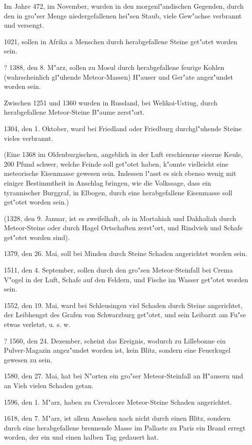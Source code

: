 \documentclass[a4paper, 11pt, oneside, polutonikogreek, german]{article}
\begin{document}
Im Jahre 472, im November, wurden in den morgenl"andischen Gegenden, durch den in gro"ser Menge niedergefallenen hei"sen Staub, viele Gew"achse verbrannt und versengt.

1021, sollen in Afrika a Menschen durch herabgefallene Steine get"otet worden sein.

? 1388, den 8. M"arz, sollen zu Mosul durch herabgefallene feurige Kohlen (wahrscheinlich gl"uhende Meteor-Massen) H"auser und Ger"ate angez"undet worden sein.

Zwischen 1251 und 1360 wurden in Russland, bei Welikoi-Ustiug, durch herabgefallene Meteor-Steine B"aume zerst"ort.

1304, den 1. Oktober, ward bei Friedland oder Friedburg durchgl"uhende Steine vieles verbrannt.

(Eine 1368 im Oldenburgischen, angeblich in der Luft erschienene eiserne Keule, 200 Pfund schwer, welche Feinde soll get"otet haben, k"onnte vielleicht eine meteorische Eisenmasse gewesen sein. Indessen l"asst es sich ebenso wenig mit einiger Bestimmtheit in Anschlag bringen, wie die Volkssage, dass ein tyrannischer Burggraf, in Elbogen, durch eine herabgefallene Eisenmasse soll get"otet worden sein.)

(1328, den 9. Januar, ist es zweifelhaft, ob in Mortahiah und Dakhaliah durch Meteor-Steine oder durch Hagel Ortschaften zerst"ort, und Rindvieh und Schafe get"otet worden sind).

1379, den 26. Mai, soll bei Minden durch Steine Schaden angerichtet worden sein.

1511, den 4. September, sollen durch den gro"sen Meteor-Steinfall bei Crema V"ogel in der Luft, Schafe auf den Feldern, und Fische im Wasser get"otet worden sein.

1552, den 19. Mai, ward bei Schleusingen viel Schaden durch Steine angerichtet, der Leibhengst des Grafen von Schwarzburg get"otet, und sein Leibarzt am Fu"se etwas verletzt, u. s. w.

? 1560, den 24. Dezember, scheint das Ereignis, wodurch zu Lillebonne ein Pulver-Magazin angez"undet worden ist, kein Blitz, sondern eine Feuerkugel gewesen zu sein.

1580, den 27. Mai, hat bei N"orten ein gro"ser Meteor-Steinfall an H"ausern und an Vieh vielen Schaden getan.

1596, den 1. M"arz, haben zu Crevalcore Meteor-Steine Schaden angerichtet.

1618, den 7. M"arz, ist allem Ansehen nach nicht durch einen Blitz, sondern durch eine herabgefallene brennende Masse im Pallaste zu Paris ein Brand erregt worden, der ein und einen halben Tag gedauert hat.
\end{document}
